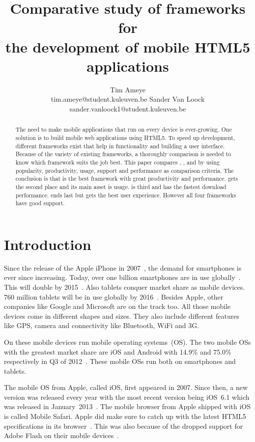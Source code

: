 \documentclass[a4paper]{artikel3}
\title{Comparative study of frameworks for \\ the development of mobile HTML5 applications}
\author{Tim Ameye \\ tim.ameye@student.kuleuven.be \And Sander Van Loock \\ sander.vanloock1@student.kuleuven.be}
\begin{document}
\maketitle

\begin{abstract}
The need to make mobile applications that run on every device is ever-growing.
One solution is to build mobile web applications using HTML5.
To speed up development, different frameworks exist that help in functionality and building a user interface.
Because of the variety of existing frameworks, a thoroughly comparison is needed to know which framework suits the job best.
This paper compares \st{}, \jqm{}, \kendo{} and \lungo{} by using popularity, productivity, usage, support and performance as comparison criteria. 
The conclusion is that \jqm{} is the best framework with great productivity and performance. 
\kendo{} gets the second place and its main asset is usage.
\lungo{} is third and has the fastest download performance.
\st{} ends last but gets the best user experience.
However all four frameworks have good support.
\end{abstract}


\section{Introduction} %
\label{sec:introduction}
Since the release of the Apple iPhone in 2007~\cite{David2011}, the demand for smartphones is ever since increasing. 
Today, over one billion smartphones are in use globally~\cite{Yang2012}.
This will double by 2015~\cite{Gillett2012}.
Also tablets conquer market share as mobile devices.
760 million tablets will be in use globally by 2016~\cite{Gillett2012}.
Besides Apple, other companies like Google and Microsoft are on the track too.
All those mobile devices come in different shapes and sizes.
They also include different features like GPS, camera and connectivity like Bluetooth, WiFi and 3G.

On these mobile devices run mobile operating systems~(OS). The two mobile OSs with the greatest market share are iOS and Android with 14.9\% and 75.0\% respectively in Q3 of 2012~\cite{Protalinski2012}.
These mobile OSs run both on smartphones and tablets.

The mobile OS from Apple, called iOS, first appeared in 2007.
Since then, a new version was released every year with the most recent version being iOS~6.1 which was released in January~2013~\cite{Deitel2012,PhilDutson2012,Apple2013}.
The mobile browser from Apple shipped with iOS is called Mobile Safari.
Apple did make sure to catch up with the latest HTML5 specifications in its browser~\cite{Hales2012}.
This was also because of the dropped support for Adobe Flash on their mobile devices~\cite{Jobs2010}.
\end{document}
